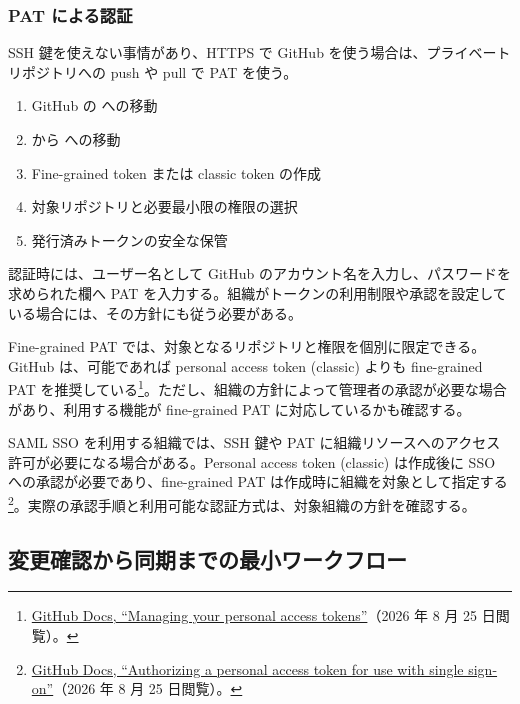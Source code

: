 \subsubsection{PAT による認証}

SSH 鍵を使えない事情があり、HTTPS で GitHub を使う場合は、プライベートリポジトリへの push や pull で PAT を使う。

\begin{enumerate}
\item GitHub の  への移動
\item {} から  への移動
\item Fine-grained token または classic token の作成
\item 対象リポジトリと必要最小限の権限の選択
\item 発行済みトークンの安全な保管
\end{enumerate}

認証時には、ユーザー名として GitHub のアカウント名を入力し、パスワードを求められた欄へ PAT を入力する。組織がトークンの利用制限や承認を設定している場合には、その方針にも従う必要がある。

Fine-grained PAT では、対象となるリポジトリと権限を個別に限定できる。GitHub は、可能であれば personal access token (classic) よりも fine-grained PAT を推奨している\footnote{\href{https://docs.github.com/en/authentication/keeping-your-account-and-data-secure/managing-your-personal-access-tokens}{GitHub Docs, ``Managing your personal access tokens''}（2026 年 8 月 25 日閲覧）。}。ただし、組織の方針によって管理者の承認が必要な場合があり、利用する機能が fine-grained PAT に対応しているかも確認する。

SAML SSO を利用する組織では、SSH 鍵や PAT に組織リソースへのアクセス許可が必要になる場合がある。Personal access token (classic) は作成後に SSO への承認が必要であり、fine-grained PAT は作成時に組織を対象として指定する\footnote{\href{https://docs.github.com/authentication/authenticating-with-saml-single-sign-on/authorizing-a-personal-access-token-for-use-with-saml-single-sign-on}{GitHub Docs, ``Authorizing a personal access token for use with single sign-on''}（2026 年 8 月 25 日閲覧）。}。実際の承認手順と利用可能な認証方式は、対象組織の方針を確認する。

\subsection{変更確認から同期までの最小ワークフロー}

